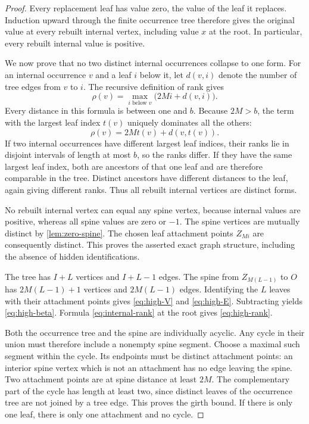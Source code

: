 \documentclass[11pt,a4paper]{article}
\numberwithin{equation}{section}
\theoremstyle{definition}
\theoremstyle{remark}
\newcommand{\rk}{\rho}
\begin{document}
\begin{proof}
Every replacement leaf has value zero, the value of the leaf it replaces.
Induction upward through the finite occurrence tree therefore gives the
original value at every rebuilt internal vertex, including value $x$ at the
root. In particular, every rebuilt internal value is positive.

We now prove that no two distinct internal occurrences collapse to one form.
For an internal occurrence $v$ and a leaf $i$ below it, let $d(v,i)$ denote the
number of tree edges from $v$ to $i$. The recursive definition of rank gives
\begin{equation}
\label{eq:internal-rank}
 \rk(v)=\max_{i\text{ below }v}\bigl(2Mi+d(v,i)\bigr).
\end{equation}
Every distance in this formula is between one and $b$. Because $2M>b$, the
term with the largest leaf index $t(v)$ uniquely dominates all the others:
\begin{equation}
 \rk(v)=2Mt(v)+d(v,t(v)).
\end{equation}
If two internal occurrences have different largest leaf indices, their ranks
lie in disjoint intervals of length at most $b$, so the ranks differ. If they
have the same largest leaf index, both are ancestors of that one leaf and are
therefore comparable in the tree. Distinct ancestors have different distances
to the leaf, again giving different ranks. Thus all rebuilt internal vertices
are distinct forms.

No rebuilt internal vertex can equal any spine vertex, because internal values
are positive, whereas all spine values are zero or $-1$. The spine vertices
are mutually distinct by \cref{lem:zero-spine}. The chosen leaf attachment
points $Z_{Mi}$ are consequently distinct. This proves the asserted exact graph
structure, including the absence of hidden identifications.

The tree has $I+L$ vertices and $I+L-1$ edges. The spine from $Z_{M(L-1)}$ to
$O$ has $2M(L-1)+1$ vertices and $2M(L-1)$ edges. Identifying the $L$ leaves
with their attachment points gives \eqref{eq:high-V} and \eqref{eq:high-E}.
Subtracting yields \eqref{eq:high-beta}. Formula \eqref{eq:internal-rank} at
the root gives \eqref{eq:high-rank}.

Both the occurrence tree and the spine are individually acyclic. Any cycle in
their union must therefore include a nonempty spine segment. Choose a maximal
such segment within the cycle. Its endpoints must be distinct attachment
points: an interior spine vertex which is not an attachment has no edge leaving
the spine. Two attachment points are at spine distance at least $2M$. The
complementary part of the cycle has length at least two, since distinct leaves
of the occurrence tree are not joined by a tree edge. This proves the girth
bound. If there is only one leaf, there is only one attachment and no cycle.
\end{proof}
\end{document}
